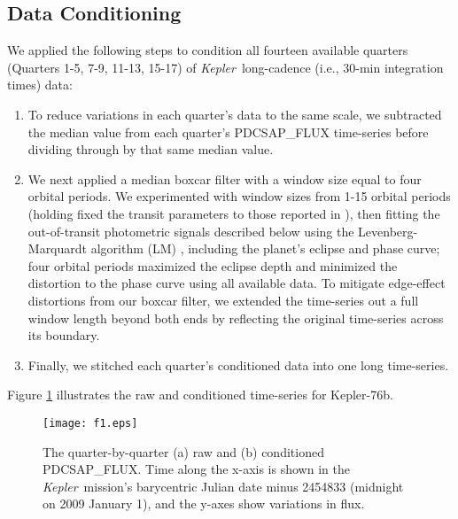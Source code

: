 \documentclass[manuscript]{aastex62}
\newcommand{\kepler}{{\it Kepler}}
\begin{document}
\subsection{Data Conditioning}
We applied the following steps to condition all fourteen available quarters (Quarters 1-5, 7-9, 11-13, 15-17) of \kepler\ long-cadence (i.e., 30-min integration times) data:
\begin{enumerate}
\item To reduce variations in each quarter's data to the same scale, we subtracted the median value from each quarter's PDCSAP\_FLUX time-series before dividing through by that same median value.
\item We next applied a median boxcar filter with a window size equal to four orbital periods. We experimented with window sizes from 1-15 orbital periods (holding fixed the transit parameters to those reported in \citealt{2013ApJ...771...26F}), then fitting the out-of-transit photometric signals described below using the Levenberg-Marquardt algorithm (LM) \citep{newville_2014_11813}, including the planet's eclipse and phase curve; four orbital periods maximized the eclipse depth and minimized the distortion to the phase curve using all available data. To mitigate edge-effect distortions from our boxcar filter, we extended the time-series out a full window length beyond both ends by reflecting the original time-series across its boundary.
\item Finally, we stitched each quarter's conditioned data into one long time-series.
\end{enumerate}
Figure \ref{fig:raw-conditioned-data_Analysis_of_Kepler76b} illustrates the raw and conditioned time-series for Kepler-76b. 

\begin{figure}
\texttt{[image: f1.eps]}
\caption{The quarter-by-quarter (a) raw and (b) conditioned PDCSAP\_FLUX. Time along the x-axis is shown in the \kepler\ mission's barycentric Julian date minus 2454833 (midnight on 2009 January 1), and the y-axes show variations in flux.\label{fig:raw-conditioned-data_Analysis_of_Kepler76b}}
\end{figure}
\end{document}
